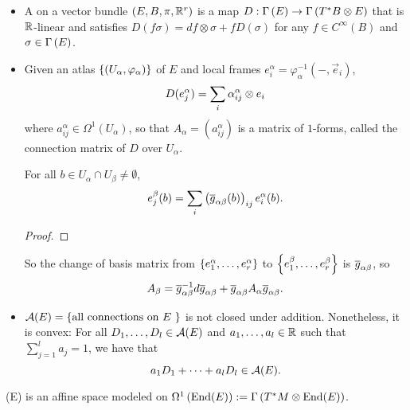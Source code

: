 \documentclass[main.tex]{subfiles}
\begin{document}
\begin{itemize}
    \item  A  on a vector bundle $(E, B, \pi, \mathbb{R}^r)$ is a map $D : \Gamma\left( E \right) \to \Gamma\left( T^*B \otimes E \right)$ that is $\mathbb{R}$-linear and satisfies $D(f\sigma) = df \otimes \sigma + fD(\sigma)$ for any $f \in C^\infty(B)$ and $\sigma \in \Gamma\left( E \right)$.

    \item Given an atlas $\left\{ \left( U_\alpha, \varphi_\alpha \right) \right\}$ of $E$ and local frames $e_i^\alpha = \varphi_{\alpha}^{-1}(-, \vec{e}_i)$, 
    \[
    D(e_j^\alpha) = \sum_i \alpha_{ij}^\alpha \otimes e_i
    \]
    where $a_{ij}^\alpha \in \Omega^1(U_\alpha)$, so that $A_\alpha = (a_{ij}^\alpha)$ is a matrix of $1$-forms, called the connection matrix of $D$ over $U_\alpha$.
    
     For all $b \in U_\alpha \cap U_\beta \neq \emptyset$, 
\[
e_j^\beta(b) = \sum_i \left( \overline{g}_{\alpha\beta}(b) \right)_{ij}e_i^\alpha(b).
\]

\begin{proof}
\end{proof} So the change of basis matrix from $\left\{e_1^\alpha, \dots, e_r^\alpha\right\}$ to $\left\{ e_1^\beta, \dots, e_r^\beta \right\}$ is $\overline{g}_{\alpha\beta}$, so
\[
A_\beta = \overline{g}_{\alpha\beta}^{-1} d \overline{g}_{\alpha\beta} + \overline{g}_{\alpha\beta} A_\alpha \overline{g}_{\alpha\beta}.
\]

\item $\mathcal{A}(E) = \left\{ \text{all connections on $E$ }\right\}$ is not closed under addition. Nonetheless, it is convex: For all $D_1, \dots, D_l \in \mathcal{A}(E)$ and $a_1, \dots, a_l \in \mathbb{R}$ such that $\sum_{j=1}^l a_j = 1$, we have that 
\[
    a_1D_1 + \dots + a_lD_l \in \mathcal{A}(E).
\]
\end{itemize}

\begin{prop}
(E) is an affine space modeled on $\Omega^1\left( \text{End}(E) \right) := \Gamma\left( T^*M \otimes \text{End}(E) \right)$.
\end{prop}
\end{document}
